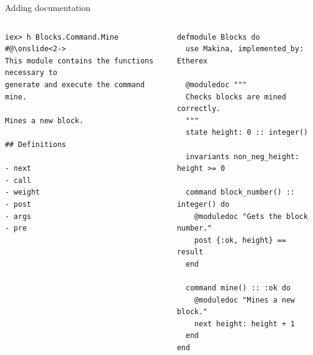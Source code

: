 \documentclass[aspectratio=169, 10pt, handout]{beamer}
\begin{document}
\begin{frame}[label={sec:orga2a0473},fragile]{Adding documentation}
 \begin{columns}
\begin{column}{0.48\columnwidth}
\lstset{language=bash,label= ,caption= ,captionpos=b,numbers=none,style=shell}
\begin{lstlisting}
iex> h Blocks.Command.Mine
#@\onslide<2->
This module contains the functions necessary to
generate and execute the command mine.

Mines a new block.

## Definitions

- next
- call
- weight
- post
- args
- pre
\end{lstlisting}
\end{column}

\begin{column}{0.48\columnwidth}
\lstset{language=elixir,label= ,caption= ,captionpos=b,numbers=none,style=display}
\begin{lstlisting}
defmodule Blocks do
  use Makina, implemented_by: Etherex

  @moduledoc """
  Checks blocks are mined correctly.
  """
  state height: 0 :: integer()

  invariants non_neg_height: height >= 0

  command block_number() :: integer() do
    @moduledoc "Gets the block number."
    post {:ok, height} == result
  end

  command mine() :: :ok do
    @moduledoc "Mines a new block."
    next height: height + 1
  end
end
\end{lstlisting}
\end{column}
\end{columns}
\end{frame}
\end{document}
